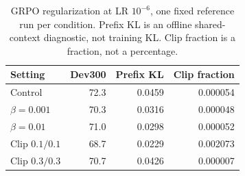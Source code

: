 \begin{table}[t]
\centering
\caption{GRPO regularization at LR $10^{-6}$, one fixed reference run per condition. Prefix KL is an offline shared-context diagnostic, not training KL. Clip fraction is a fraction, not a percentage.}
\label{tab:regularization}
\footnotesize
\setlength{\tabcolsep}{4pt}
\begin{tabular}{lrrr}
\toprule
Setting & Dev300 & Prefix KL & Clip fraction\\
\midrule
Control & 72.3 & 0.0459 & 0.000054\\
$\beta=0.001$ & 70.3 & 0.0316 & 0.000048\\
$\beta=0.01$ & 71.0 & 0.0298 & 0.000052\\
Clip $0.1/0.1$ & 68.7 & 0.0229 & 0.002073\\
Clip $0.3/0.3$ & 70.7 & 0.0426 & 0.000007\\
\bottomrule
\end{tabular}
\end{table}
